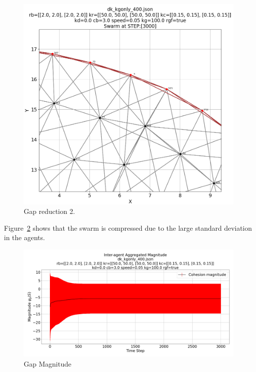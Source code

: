 \documentclass[12pt,a4paper]{IEEEtran}
\begin{document}
\begin{figure}[H]
	\begin{center}
		\includegraphics[width=1.0\linewidth]{figures/gap2}
	\end{center}
	\caption{Gap reduction 2. \label{fig:gap2}}
\end{figure}

Figure~\ref{fig:gapMagnitude} shows that the swarm is compressed due to the large standard deviation in the agents.

\begin{figure}[H]
	\begin{center}
		\includegraphics[width=1.0\linewidth]{figures/gapMagnitude}
	\end{center}
	\caption{Gap Magnitude\label{fig:gapMagnitude}}
\end{figure}
\end{document}
